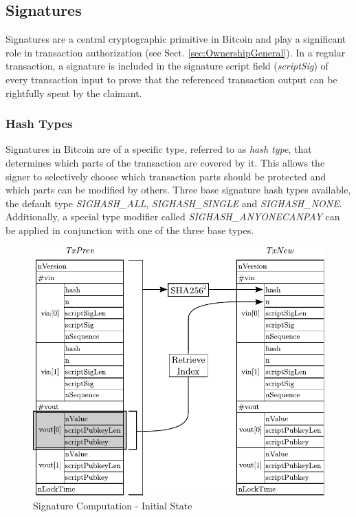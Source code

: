 \clearpage
\subsection{Signatures} \label{sec:Signatures}
Signatures are a central cryptographic primitive in Bitcoin and play a significant role in transaction authorization (see Sect. \ref{sec:OwnershipGeneral}). In a regular transaction, a signature is included in the signature script field (\textit{scriptSig}) of every transaction input to prove that the referenced transaction output can be rightfully spent by the claimant.

\subsubsection{Hash Types}
Signatures in Bitcoin are of a specific type, referred to as \emph{hash type}, that determines which parts of the transaction are covered by it. This allows the signer to selectively choose which transaction parts should be protected and which parts can be modified by others. Three base signature hash types available, the default type \emph{SIGHASH\_ALL}, \emph{SIGHASH\_SINGLE} and \emph{SIGHASH\_NONE}. Additionally, a special type modifier called \emph{SIGHASH\_ANYONECANPAY} can be applied in conjunction with one of the three base types.

\vspace{-5pt}
\begin{figure}[ht!]
 \centering
 \includegraphics[scale=0.9]{images/Transaction2In2Out.pdf}
 \caption{Signature Computation - Initial State} \label{fig:Signature-InitState}
\end{figure}
\vspace{-5pt}

